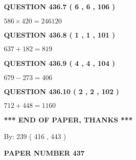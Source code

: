 \documentclass{ctexart}
\begin{document}
  
  
\vspace{0.2in}
  
{\textbf{\Large{QUESTION
436.7 
 ( 6 , 6 , 106 )
}}}
  
  
 
 

$ %
586 \times  %
420=   %
246120$
 
 
  
\vspace{0.2in}
  
{\textbf{\Large{QUESTION
436.8 
 ( 1 , 1 , 101 )
}}}
  
  
 
 

$ %
637 +  %
182=   %
819$
 
 
  
\vspace{0.2in}
  
{\textbf{\Large{QUESTION
436.9 
 ( 4 , 4 , 104 )
}}}
  
  
 
 

$ %
679 -  %
273=   %
406$
 
 
  
\vspace{0.2in}
  
{\textbf{\Large{QUESTION
436.10 
 ( 2 , 2 , 102 )
}}}
  
  
 
 

$ %
712 +  %
448=   %
1160$
 
 
   
   
 \vspace{0.2in}
 
   
   
   
   
\vspace{1.0in} 
{\textbf{\large{ *** END OF PAPER, THANKS *** }}} 
   
   
\hspace{1.0in} By: 
 239 ( 416 ,  443 )
   
   
   
   
\newpage 
\setcounter{page}{ 
   437001 } 
   
   
   
   
 {\textbf{ \Large{ PAPER NUMBER  437  }}}
   
   
\vspace{0.2in}
   
   
   
\end{document}
